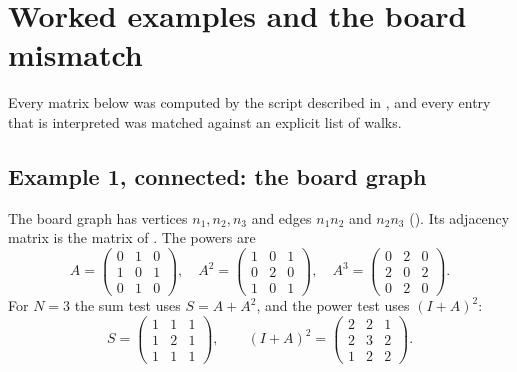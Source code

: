 \section{Worked examples and the board mismatch}\label{sec:examples}

Every matrix below was computed by the script described in , and every entry that is interpreted was matched against an explicit list of walks.

\subsection{Example 1, connected: the board graph}


The board graph has vertices $n_1,n_2,n_3$ and edges $n_1n_2$ and $n_2n_3$ (). Its adjacency matrix is the matrix of . The powers are
\[
A=\begin{pmatrix}0&1&0\\1&0&1\\0&1&0\end{pmatrix},\quad
A^2=\begin{pmatrix}1&0&1\\0&2&0\\1&0&1\end{pmatrix},\quad
A^3=\begin{pmatrix}0&2&0\\2&0&2\\0&2&0\end{pmatrix}.
\]
For $N=3$ the sum test uses $S=A+A^2$, and the power test uses $(I+A)^2$:
\[
S=\begin{pmatrix}1&1&1\\1&2&1\\1&1&1\end{pmatrix},\qquad
(I+A)^2=\begin{pmatrix}2&2&1\\2&3&2\\1&2&2\end{pmatrix}.
\]

